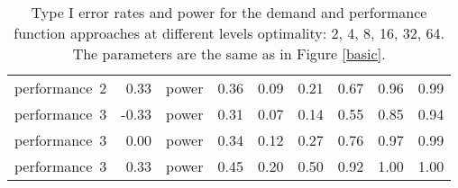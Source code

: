 \begin{table}[ht]
\begin{tabular}{lrlrrrrrr}
  performance~2 & 0.33 & power & 0.36 & 0.09 & 0.21 & 0.67 & 0.96 & 0.99 \\ 
  performance~3 & -0.33 & power & 0.31 & 0.07 & 0.14 & 0.55 & 0.85 & 0.94 \\ 
  performance~3 & 0.00 & power & 0.34 & 0.12 & 0.27 & 0.76 & 0.97 & 0.99 \\ 
  performance~3 & 0.33 & power & 0.45 & 0.20 & 0.50 & 0.92 & 1.00 & 1.00 \\ 
   \hline
\end{tabular}
\endgroup
\caption{Type I error rates and power for the demand and
             performance function approaches at different levels optimality: 
             2, 4, 8, 16, 32, 64. The parameters are the same as in Figure 
             \ref{basic}.} 
\label{basic-error}
\end{table}
